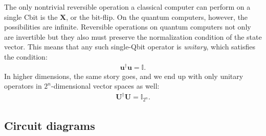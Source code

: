 \documentclass{book}
\theoremstyle{definition}
\newcommand{\X}{\mathbf{X}}
\newcommand{\U}{\mathbf{U}}
\newcommand{\Id}{\mathbb{I}}
\begin{document}
The only nontrivial reversible operation a classical computer can perform on a single Cbit is the $\X$, or the bit-flip. On the quantum computers, however, the possibilities are infinite. Reversible operations on quantum computers not only are invertible but they also must preserve the normalization condition of the state vector. This means that any such single-Qbit operator is \textit{unitary}, which satisfies the condition:
\begin{align}
\mathbf{u}^\dagger\mathbf{u} = \Id.
\end{align}
In higher dimensions, the same story goes, and we end up with only unitary operators in $2^n$-dimensional vector spaces as well:
\begin{align}
\U^\dagger \U = \Id_{2^n}.
\end{align}















\subsection{Circuit diagrams}
\end{document}
